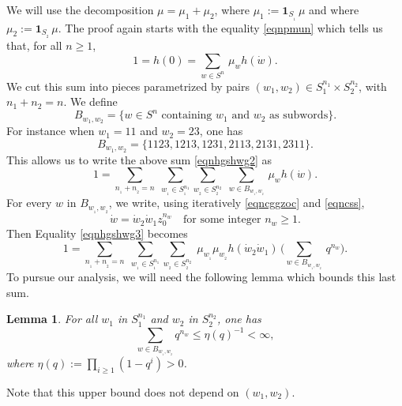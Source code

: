 \documentclass[JEP,XML,SOM,Unicode]{cedram}
\newtheorem{Lem}[Thm]{Lemma}
\theoremstyle{definition}
\begin{document}
We will use the decomposition $\mu=\mu_1+\mu_2$, where $\mu_1:=\mathbf{1}_{S_{_1}}\,\mu$ and
where \hbox{$\mu_2:=\mathbf{1}_{S_{_2}}\,\mu$}.
The proof again starts with the equality \eqref{eqnpmun}
which tells us that, for all $n\geq 1$,
\begin{equation}
\label{eqnhgshwg2}
1=h(0)=
\sum_{w\in S^n}\, \mu_w h(\dot{w}).
\end{equation}
We cut this sum into pieces
parametrized by pairs $(w_1,w_2)\!\in\!S_1^{n_1}\!\times\!S_2^{n_2}$,
with \hbox{$n_1\!+\!n_2\!=\!n$}. We define
\[
B_{w_1,w_2}=\{ w\in S^n \text{ containing $w_1$ and $w_2$ as subwords}\}.
\]
For instance when
$w_1=11$ and $w_2=23$,
one has
\[
B_{w_1,w_2}=\{1123,1213,1231,2113,2131,2311\}.
\]
This allows us to write the above sum \eqref{eqnhgshwg2} as
\begin{equation}
\label{eqnhgshwg3}
1=
\sum_{n_{_1}+n_{_2}=n}\;
\sum_{w_{_1}\in S_{_1}^{n_1}}
\sum_{w_{_2}\in S_{_2}^{n_2}}\;
\sum_{w\in B_{w_{_1}\!,w_{_2}}}\, \mu_w h(\dot{w}).
\end{equation}
For every $w$ in $B_{w_{_1},w_{_2}}$, we write, using iteratively \eqref{eqncggzoc}
and \eqref{eqncss},
\begin{equation}
\label{eqngwgwgw}
\dot{w}=\dot{w}_{2}\dot{w}_{1}z_0^{n_w}
\quad\text{for some integer $n_w\geq 1$}.
\end{equation}
Then Equality \eqref{eqnhgshwg3} becomes
\begin{equation}
\label{eqnhgshwg4}
1=
\sum_{n_{_1}+n_{_2}=n}\;
\sum_{w_{_1}\in S_{_1}^{n_1}}
\sum_{w_{_2}\in S_{_2}^{n_2}}\;
\mu_{w_{_1}} \mu_{w_{_2}} h(\dot{w}_{2}\dot{w}_{1})\,
\biggl(\sum_{w\in B_{w_{_1}\!,w_{_2}}}\,q^{n_w}\biggr).
\end{equation}
To pursue our analysis, we will need the following lemma which
bounds this last sum.

\begin{Lem}
\label{lemsumbww}
For all $w_1$ in $S_1^{n_1}$ and $w_2$ in $S_2^{n_2}$, one has
\begin{equation}
\label{eqnswbwbw}
\sum_{w\in B_{w_{_1}\!,w_{_2}}} q^{n_w}
\leq
\eta(q)^{-1}<\infty,
\end{equation}
where $\eta(q):=\prod\limits_{i\geq 1}(1-q^i)>0$.
\end{Lem}

Note that this upper bound does not depend on $(w_1,w_2)$.
\end{document}
